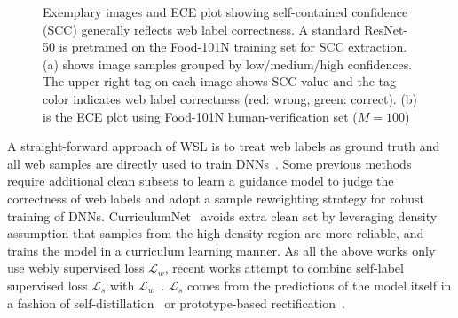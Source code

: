 \documentclass[runningheads]{llncs}
\begin{document}
\begin{figure}[t]
	\centering
     \hfill
	\caption{Exemplary images and ECE plot showing self-contained confidence (SCC) generally reflects web label correctness. A standard ResNet-50 is pretrained on the Food-101N training set for SCC extraction. (a) shows image samples grouped by low/medium/high confidences. The upper right tag on each image shows SCC value and the tag color indicates web label correctness (red: wrong, green: correct). (b) is the ECE plot using Food-101N human-verification set ($M=100$)}
	\label{fig:into}
\end{figure}

A straight-forward approach of WSL is to treat web labels as ground truth and all web samples are directly used to train DNNs~\cite{mahajan2018exploring,sun2017revisiting}. 
Some previous methods~\cite{jiang2018mentornet,lee2018cleannet} require additional clean subsets to learn a guidance model to judge the correctness of web labels and adopt a sample reweighting strategy for robust training of DNNs.
CurriculumNet~\cite{guo2018curriculumnet} avoids extra clean set by leveraging density assumption that samples from the high-density region are more reliable, and trains the model in a curriculum learning manner.
As all the above works only use webly supervised loss $\mathcal{L}_w$, recent works attempt to combine self-label supervised loss $\mathcal{L}_s$ with $\mathcal{L}_w$~\cite{han2019deep,tanaka2018joint}. $\mathcal{L}_s$ comes from the predictions of the model itself in a fashion of self-distillation~\cite{hinton2015distilling} or prototype-based rectification~\cite{snell2017prototypical}. 
\end{document}
